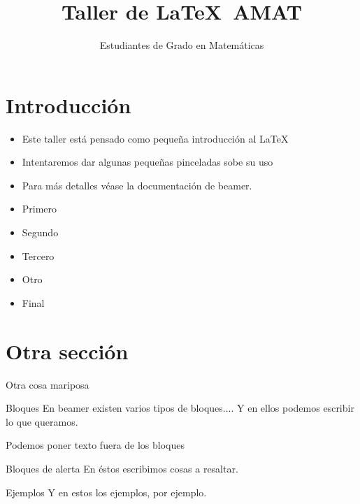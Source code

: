 \documentclass{beamer}
\title[Taller de \LaTeX]{Taller de \LaTeX\ AMAT}
\author[Los presentes]{Estudiantes de Grado en Matemáticas}
\institute[UGR]{Universidad de Granada}
\begin{document}
\maketitle


\section*{Introducción}

\begin{frame}
\begin{itemize}[<+-|alert@+>]
\item Este taller está pensado como pequeña introducción al \LaTeX 

\item Intentaremos dar algunas pequeñas pinceladas sobe su uso 

\item Para m\'as detalles véase la documentación de beamer.
\end{itemize}
\end{frame}

\begin{frame}
\begin{itemize}
\item<1-> Primero
\item<2-> Segundo
\item<3,4>Tercero
\item<2> Otro
\item<5-> Final
\end{itemize}
\end{frame}

\section{Otra sección}

\begin{frame}{Otra cosa mariposa}
\begin{block}{Bloques}
En beamer existen varios tipos de bloques....
Y en ellos podemos escribir lo que queramos.
\end{block}

Podemos poner texto fuera de los bloques

\begin{alertblock}{Bloques de alerta}
En éstos escribimos cosas a resaltar.
\end{alertblock}

\begin{exampleblock}{Ejemplos}
Y en estos los ejemplos, por ejemplo.
\end{exampleblock}

\end{frame}
\end{document}
